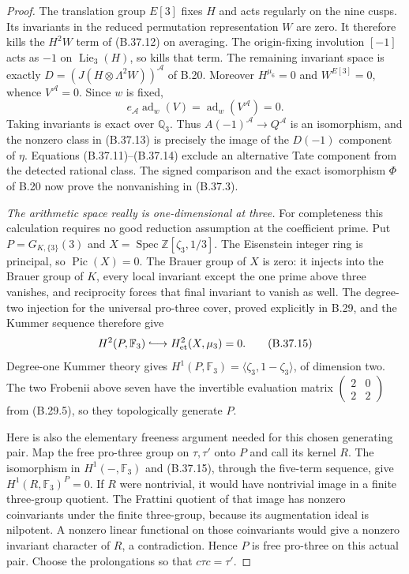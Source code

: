 \begin{proof}
The translation group $E[3]$ fixes $H$ and acts regularly
on the nine cusps. Its invariants in the reduced
permutation representation $W$ are zero. It therefore
kills the $H^2W$ term of (B.37.12) on averaging.
The origin-fixing involution $[-1]$ acts as $-1$ on
$\operatorname{Lie}_3(H)$, so kills that term.
The remaining invariant space is exactly
$D=(J(H\otimes\Lambda^2W))^{\mathcal A}$ of B.20.
Moreover $H^{\mu_6}=0$ and $W^{E[3]}=0$, whence
$V^{\mathcal A}=0$. Since $w$ is fixed,
\[
            e_{\mathcal A}\operatorname{ad}_w(V)
                        =\operatorname{ad}_w(V^{\mathcal A})=0.
                                                               \tag{B.37.14}
\]
Taking invariants is exact over $\mathbb Q_3$.
Thus $A(-1)^{\mathcal A}\to Q^{\mathcal A}$ is an
isomorphism, and the nonzero class in (B.37.13) is
precisely the image of the $D(-1)$ component of $\eta$.
Equations (B.37.11)--(B.37.14) exclude an alternative
Tate component from the detected rational class.
The signed comparison and the exact isomorphism $\Phi$
of B.20 now prove the nonvanishing in (B.37.3).

\emph{The arithmetic space really is one-dimensional at three.}
For completeness this calculation requires no good
reduction assumption at the coefficient prime.
Put $P=G_{K,\{3\}}(3)$ and
$X=\operatorname{Spec}\mathbb Z[\zeta_3,1/3]$.
The Eisenstein integer ring is principal, so
$\operatorname{Pic}(X)=0$.
The Brauer group of $X$ is zero: it injects into the
Brauer group of $K$, every local invariant except the
one prime above three vanishes, and reciprocity forces
that final invariant to vanish as well.
The degree-two injection for the universal pro-three
cover, proved explicitly in B.29, and the Kummer sequence
therefore give
\[
 H^2(P,\mathbb F_3)\lhook\joinrel\longrightarrow
 H^2_{\rm et}(X,\mu_3)=0.                                   \tag{B.37.15}
\]
Degree-one Kummer theory gives
$H^1(P,\mathbb F_3)=\langle\zeta_3,1-\zeta_3\rangle$,
of dimension two. The two Frobenii above seven have
the invertible evaluation matrix
$\left(\begin{smallmatrix}2&0\\2&2\end{smallmatrix}\right)$
from (B.29.5), so they topologically generate $P$.

Here is also the elementary freeness argument needed
for this chosen generating pair. Map the free pro-three
group on $\tau,\tau'$ onto $P$ and call its kernel $R$.
The isomorphism in $H^1(-,\mathbb F_3)$ and (B.37.15),
through the five-term sequence, give
$H^1(R,\mathbb F_3)^P=0$.
If $R$ were nontrivial, it would have nontrivial image
in a finite three-group quotient. The Frattini quotient
of that image has nonzero coinvariants under the finite
three-group, because its augmentation ideal is nilpotent.
A nonzero linear functional on those coinvariants would
give a nonzero invariant character of $R$, a contradiction.
Hence $P$ is free pro-three on this actual pair.
Choose the prolongations so that $c\tau c=\tau'$.


\end{proof}
